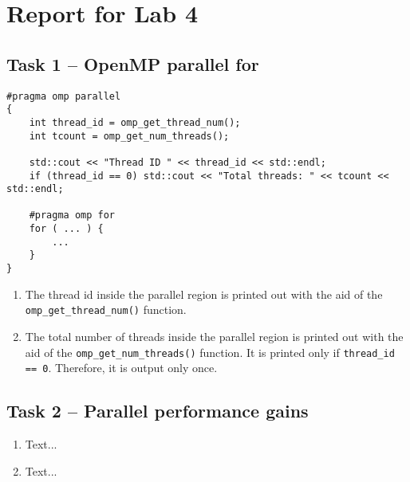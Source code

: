 \documentclass[a4paper, DIV12, headsepline]{scrartcl}
\begin{document}
\section*{Report for Lab 4}
\subsection*{Task 1 -- OpenMP parallel for}
\begin{verbatim}
#pragma omp parallel
{
    int thread_id = omp_get_thread_num();
    int tcount = omp_get_num_threads();

    std::cout << "Thread ID " << thread_id << std::endl;
    if (thread_id == 0) std::cout << "Total threads: " << tcount << std::endl;

    #pragma omp for
    for ( ... ) {
        ...
    }
}
\end{verbatim}
\begin{enumerate}
\item The thread id inside the parallel region is printed out with the aid of the \texttt{omp\_get\_thread\_num()} function.

\item The total number of threads inside the parallel region is printed out with the aid of the \verb|omp_get_num_threads()| function. It is printed only if \verb|thread_id == 0|. Therefore, it is output only once.
\end{enumerate}


\subsection*{Task 2 -- Parallel performance gains}
\begin{enumerate}
\item Text...

\item Text...
\end{enumerate}

% 
% 
% 
\end{document}
